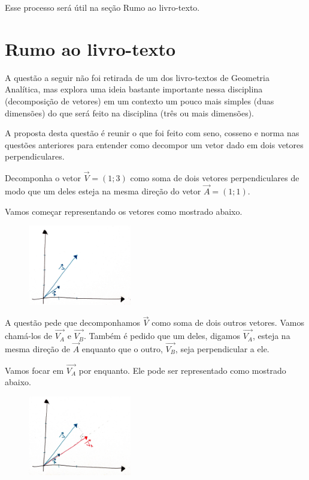 \documentclass[main.tex]{subfiles}
\begin{document}
Esse processo será útil na seção Rumo ao livro-texto.

\section{Rumo ao livro-texto}

A questão a seguir não foi retirada de um dos livro-textos de Geometria Analítica, mas explora uma ideia bastante importante nessa disciplina (decomposição de vetores) em um contexto um pouco mais simples (duas dimensões) do que será feito na disciplina (três ou mais dimensões).

A proposta desta questão é reunir o que foi feito com seno, cosseno e norma nas questões anteriores para entender como decompor um vetor dado em dois vetores perpendiculares.

\begin{resolvida}
Decomponha o vetor $\overrightarrow{V}=(1;3)$ como soma de dois vetores perpendiculares de modo que um deles esteja na mesma direção do vetor $\overrightarrow{A}=(1;1)$.
\end{resolvida}

Vamos começar representando os vetores como mostrado abaixo.

\begin{figure}[h]
\centering
\includegraphics[width=0.4\textwidth]{./img/c4r1.jpg}
\end{figure}

A questão pede que decomponhamos $\overrightarrow{V}$ como soma de dois outros vetores. Vamos chamá-los de $\overrightarrow{V_A}$ e $\overrightarrow{V_B}$. Também é pedido que um deles, digamos $\overrightarrow{V_A}$, esteja na mesma direção de $\overrightarrow{A}$ enquanto que o outro, $\overrightarrow{V_B}$, seja perpendicular a ele.

Vamos focar em $\overrightarrow{V_A}$ por enquanto. Ele pode ser representado como mostrado abaixo.

\begin{figure}[h]
\centering
\includegraphics[width=0.4\textwidth]{./img/c4r2.jpg}
\end{figure}
\end{document}
